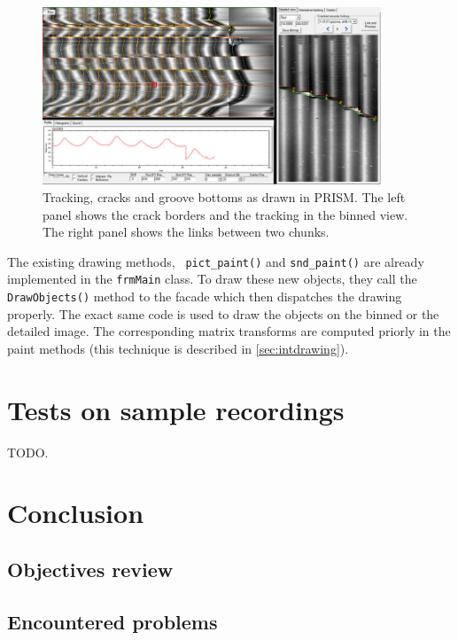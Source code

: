 \begin{figure}[!ht]
\centering
\includegraphics[width=0.9\textwidth]{images/prism-draw-ex}
\caption[Tracking, cracks and groove bottoms as drawn in PRISM.]
{Tracking, cracks and groove bottoms as drawn in PRISM. The left panel shows the crack borders and the tracking in the binned view. The right panel shows the links between two chunks.}
\label{fig:prismdrawex}
\end{figure}

The existing drawing methods, \texttt{ pict\_paint()} and \texttt{snd\_paint()} are already implemented in the \texttt{frmMain} class. To draw these new objects, they call the \texttt{DrawObjects()} method to the facade which then dispatches the drawing properly. The exact same code is used to draw the objects on the binned or the detailed image. The corresponding matrix transforms are computed priorly in the paint methods (this technique is described in \autoref{sec:intdrawing}).


\chapter{Tests on sample recordings}
\label{chap:tests}

TODO.

\chapter{Conclusion}
\label{chap:conclusion}

\section{Objectives review}

\section{Encountered problems}

